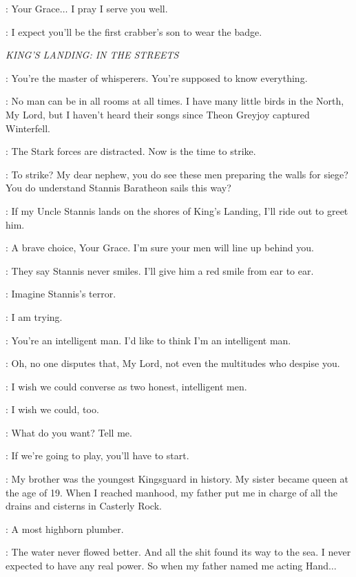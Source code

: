 \DAVOS: Your Grace$\ldots$ I pray I serve you well. 

\STANNIS: I expect you'll be the first crabber's son to wear the badge. 


\scene

\textit{KING'S LANDING: IN THE STREETS} 


\JOFFREY: You're the master of whisperers. You're supposed to know everything. 

\VARYS: No man can be in all rooms at all times. I have many little birds in the North, My Lord, but I haven't heard their songs since Theon Greyjoy captured Winterfell. 

\JOFFREY: The Stark forces are distracted. Now is the time to strike. 

\TYRION: To strike? My dear nephew, you do see these men preparing the walls for siege? You do understand Stannis Baratheon sails this way? 

\JOFFREY: If my Uncle Stannis lands on the shores of King's Landing, I'll ride out to greet him. 

\TYRION: A brave choice, Your Grace. I'm sure your men will line up behind you. 

\JOFFREY: They say Stannis never smiles. I'll give him a red smile from ear to ear. 


\TYRION: Imagine Stannis's terror. 

\VARYS: I am trying. 

\TYRION: You're an intelligent man. I'd like to think I'm an intelligent man. 

\VARYS: Oh, no one disputes that, My Lord, not even the multitudes who despise you. 

\TYRION: I wish we could converse as two honest, intelligent men. 

\VARYS: I wish we could, too. 

\TYRION: What do you want? Tell me. 

\VARYS: If we're going to play, you'll have to start. 

\TYRION: My brother was the youngest Kingsguard in history. My sister became queen at the age of 19. When I reached manhood, my father put me in charge of all the drains and cisterns in Casterly Rock. 

\VARYS: A most highborn plumber. 

\TYRION: The water never flowed better. And all the shit found its way to the sea. I never expected to have any real power. So when my father named me acting Hand$\ldots$  

